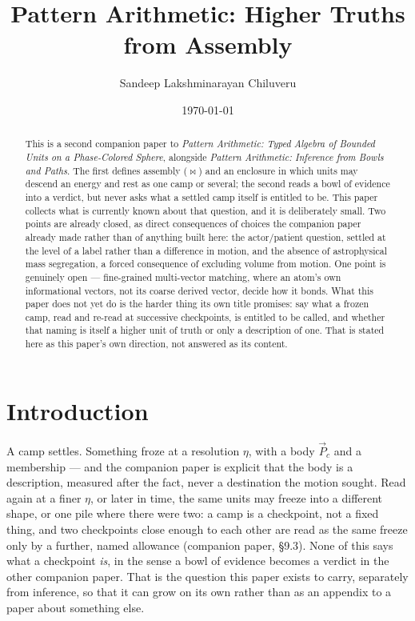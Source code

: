 \documentclass[12pt, a4paper]{article}
\title{Pattern Arithmetic: Higher Truths from Assembly}
\author{Sandeep Lakshminarayan Chiluveru}
\date{\today}
\begin{document}
\maketitle

\begin{abstract}
This is a second companion paper to \emph{Pattern Arithmetic: Typed
Algebra of Bounded Units on a Phase-Colored Sphere}, alongside
\emph{Pattern Arithmetic: Inference from Bowls and Paths}. The first
defines assembly ($\bowtie$) and an enclosure in which units may
descend an energy and rest as one camp or several; the second reads
a bowl of evidence into a verdict, but never asks what a settled
camp itself is entitled to be. This paper collects what is currently
known about that question, and it is deliberately small. Two points
are already closed, as direct consequences of choices the companion
paper already made rather than of anything built here: the
actor/patient question, settled at the level of a label rather than
a difference in motion, and the absence of astrophysical mass
segregation, a forced consequence of excluding volume from motion.
One point is genuinely open --- fine-grained multi-vector matching,
where an atom's own informational vectors, not its coarse derived vector, decide how it bonds. What this paper does not yet do is the harder thing
its own title promises: say what a frozen camp, read and re-read at
successive checkpoints, is entitled to be called, and whether that
naming is itself a higher unit of truth or only a description of
one. That is stated here as this paper's own direction, not
answered as its content.
\end{abstract}

\section{Introduction}
\label{sec:intro}

A camp settles. Something froze at a resolution $\eta$, with a body
$\vec P_{c}$ and a membership --- and the companion paper is
explicit that the body is a description, measured after the fact,
never a destination the motion sought. Read again at a finer $\eta$,
or later in time, the same units may freeze into a different shape,
or one pile where there were two: a camp is a checkpoint, not a
fixed thing, and two checkpoints close enough to each other are
read as the same freeze only by a further, named allowance
(companion paper, \S9.3). None of this says what a checkpoint
\emph{is}, in the sense a bowl of evidence becomes a verdict in the
other companion paper. That is the question this paper exists to
carry, separately from inference, so that it can grow on its own
rather than as an appendix to a paper about something else.
\end{document}
